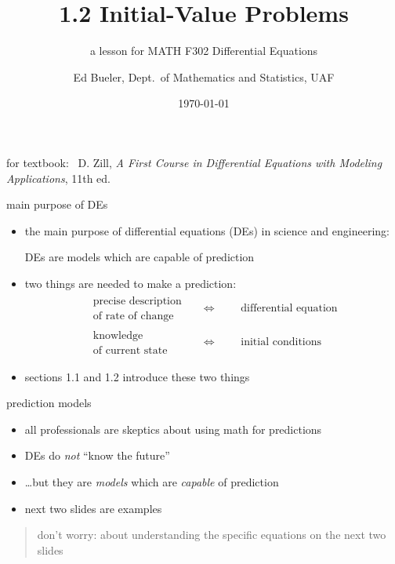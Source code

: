 \documentclass{beamer}
\title{1.2 Initial-Value Problems}
\subtitle{a lesson for MATH F302 Differential Equations}
\author{Ed Bueler, Dept.~of Mathematics and Statistics, UAF}
\date{\tiny \today}
\begin{document}


\begin{frame}
\titlepage

\centerline{\tiny for textbook: \, D. Zill, \emph{A First Course in Differential Equations with Modeling Applications}, 11th ed.}
\end{frame}


\begin{frame}{main purpose of DEs}

\begin{itemize}
\item the main purpose of differential equations (DEs) in science and engineering:

\bigskip

    \centerline{\alert{DEs are models which are capable of prediction}}

\bigskip

\item two things are needed to make a prediction:
\begin{align*}
\begin{matrix}
\text{precise description} \\
\text{of rate of change}
\end{matrix} && \iff && &\text{differential equation} \\
\begin{matrix}
\text{knowledge} \\
\text{of current state}
\end{matrix} && \iff && &\text{initial conditions}
\end{align*}
\item sections 1.1 and 1.2 introduce these two things
\end{itemize}
\end{frame}


\begin{frame}{prediction models}

\begin{itemize}
\item all professionals are skeptics about using math for predictions
\item DEs do \emph{not} ``know the future''
\item \dots but they are \emph{models} which are \emph{capable} of prediction
\item next two slides are examples
\end{itemize}

\bigskip
\begin{quote}
\alert{don't worry}: about understanding the specific equations on the next two slides
\end{quote}
\end{frame}
\end{document}
